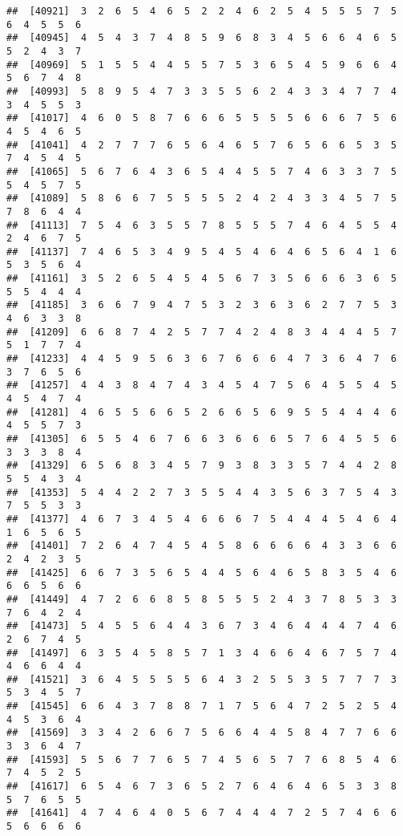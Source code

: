 \documentclass[
]{book}
\begin{document}
\begin{verbatim}
##  [40921]  3  2  6  5  4  6  5  2  2  4  6  2  5  4  5  5  5  7  5  6  4  5  5  6
##  [40945]  4  5  4  3  7  4  8  5  9  6  8  3  4  5  6  6  4  6  5  5  2  4  3  7
##  [40969]  5  1  5  5  4  4  5  5  7  5  3  6  5  4  5  9  6  6  4  5  6  7  4  8
##  [40993]  5  8  9  5  4  7  3  3  5  5  6  2  4  3  3  4  7  7  4  3  4  5  5  3
##  [41017]  4  6  0  5  8  7  6  6  6  5  5  5  5  6  6  6  7  5  6  4  5  4  6  5
##  [41041]  4  2  7  7  7  6  5  6  4  6  5  7  6  5  6  6  5  3  5  7  4  5  4  5
##  [41065]  5  6  7  6  4  3  6  5  4  4  5  5  7  4  6  3  3  7  5  5  4  5  7  5
##  [41089]  5  8  6  6  7  5  5  5  5  2  4  2  4  3  3  4  5  7  5  7  8  6  4  4
##  [41113]  7  5  4  6  3  5  5  7  8  5  5  5  7  4  6  4  5  5  4  2  4  6  7  5
##  [41137]  7  4  6  5  3  4  9  5  4  5  4  6  4  6  5  6  4  1  6  5  3  5  6  4
##  [41161]  3  5  2  6  5  4  5  4  5  6  7  3  5  6  6  6  3  6  5  5  5  4  4  4
##  [41185]  3  6  6  7  9  4  7  5  3  2  3  6  3  6  2  7  7  5  3  4  6  3  3  8
##  [41209]  6  6  8  7  4  2  5  7  7  4  2  4  8  3  4  4  4  5  7  5  1  7  7  4
##  [41233]  4  4  5  9  5  6  3  6  7  6  6  6  4  7  3  6  4  7  6  3  7  6  5  6
##  [41257]  4  4  3  8  4  7  4  3  4  5  4  7  5  6  4  5  5  4  5  4  5  4  7  4
##  [41281]  4  6  5  5  6  6  5  2  6  6  5  6  9  5  5  4  4  4  6  4  5  5  7  3
##  [41305]  6  5  5  4  6  7  6  6  3  6  6  6  5  7  6  4  5  5  6  3  3  3  8  4
##  [41329]  6  5  6  8  3  4  5  7  9  3  8  3  3  5  7  4  4  2  8  5  5  4  3  4
##  [41353]  5  4  4  2  2  7  3  5  5  4  4  3  5  6  3  7  5  4  3  7  5  5  3  3
##  [41377]  4  6  7  3  4  5  4  6  6  6  7  5  4  4  4  5  4  6  4  1  6  5  6  5
##  [41401]  7  2  6  4  7  4  5  4  5  8  6  6  6  6  4  3  3  6  6  2  4  2  3  5
##  [41425]  6  6  7  3  5  6  5  4  4  5  6  4  6  5  8  3  5  4  6  6  6  5  6  6
##  [41449]  4  7  2  6  6  8  5  8  5  5  5  2  4  3  7  8  5  3  3  7  6  4  2  4
##  [41473]  5  4  5  5  6  4  4  3  6  7  3  4  6  4  4  4  7  4  6  2  6  7  4  5
##  [41497]  6  3  5  4  5  8  5  7  1  3  4  6  6  4  6  7  5  7  4  4  6  6  4  4
##  [41521]  3  6  4  5  5  5  5  6  4  3  2  5  5  3  5  7  7  7  3  5  3  4  5  7
##  [41545]  6  6  4  3  7  8  8  7  1  7  5  6  4  7  2  5  2  5  4  4  5  3  6  4
##  [41569]  3  3  4  2  6  6  7  5  6  6  4  4  5  8  4  7  7  6  6  3  3  6  4  7
##  [41593]  5  5  6  7  7  6  5  7  4  5  6  5  7  7  6  8  5  4  6  7  4  5  2  5
##  [41617]  6  5  4  6  7  3  6  5  2  7  6  4  6  4  6  5  3  3  8  5  7  6  5  5
##  [41641]  4  7  4  6  4  0  5  6  7  4  4  4  7  2  5  7  4  6  6  5  6  6  6  6

\end{verbatim}
\end{document}
